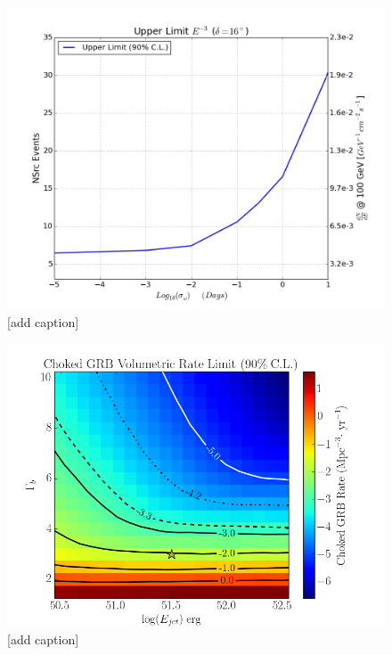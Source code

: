 \documentclass[manuscript]{aastex}
\begin{document}
\begin{figure}[ht]
  \begin{center}
    \includegraphics[width=1.0\textwidth,keepaspectratio]{plots/LowEnTransient_NEventSensitivity_E3_G1460_Dec16_DoubleY2.png}
  \end{center}
  \caption[Time-integrated Flux Limit for E$^{-3}$ Source]{[add caption]}
  \label{fig:GenericE3Limit}
\end{figure}

\begin{figure}[ht]
  \begin{center}
    \includegraphics[width=1.0\textwidth,keepaspectratio]{plots/RateLimit_2DHisto_wContours_SysAdj.png}
  \end{center}
  \caption[Choked GRB Volumetric Rate Limit]{[add caption]}
  \label{fig:VolumetricRateLimit}
\end{figure}
\acknowledgments
\end{document}
